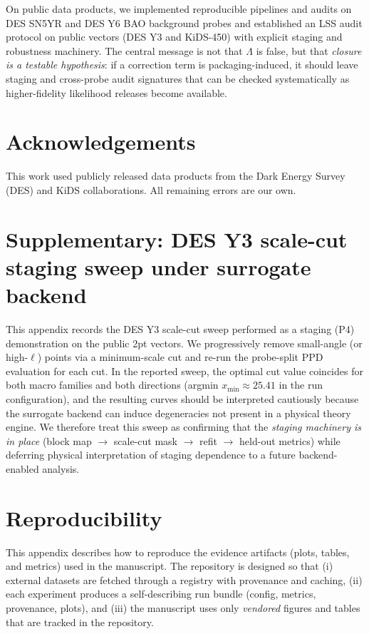 \documentclass[11pt]{article}
\theoremstyle{definition}
\theoremstyle{plain}
\theoremstyle{remark}
\begin{document}
On public data products, we implemented reproducible pipelines and audits on DES SN5YR and DES Y6 BAO background probes and established an LSS audit protocol on public vectors (DES Y3 and KiDS-450) with explicit staging and robustness machinery. The central message is not that $\Lambda$ is false, but that \emph{closure is a testable hypothesis}: if a correction term is packaging-induced, it should leave staging and cross-probe audit signatures that can be checked systematically as higher-fidelity likelihood releases become available.

\section*{Acknowledgements}
This work used publicly released data products from the Dark Energy Survey (DES) and KiDS collaborations. All remaining errors are our own.




\appendix
\section{Supplementary: DES Y3 scale-cut staging sweep under surrogate backend}\label{app:lss_scale_cut}
This appendix records the DES Y3 scale-cut sweep performed as a staging (P4) demonstration on the public 2pt vectors.
We progressively remove small-angle (or high-$\ell$) points via a minimum-scale cut and re-run the probe-split PPD evaluation for each cut.
In the reported sweep, the optimal cut value coincides for both macro families and both directions (argmin $x_{\min}\approx 25.41$ in the run configuration), and the resulting curves should be interpreted cautiously because the surrogate backend can induce degeneracies not present in a physical theory engine.
We therefore treat this sweep as confirming that the \emph{staging machinery is in place} (block map $\to$ scale-cut mask $\to$ refit $\to$ held-out metrics) while deferring physical interpretation of staging dependence to a future backend-enabled analysis.

\section{Reproducibility}\label{app:repro}
This appendix describes how to reproduce the evidence artifacts (plots, tables, and metrics) used in the manuscript. The repository is designed so that (i) external datasets are fetched through a registry with provenance and caching, (ii) each experiment produces a self-describing run bundle (config, metrics, provenance, plots), and (iii) the manuscript uses only \emph{vendored} figures and tables that are tracked in the repository.
\end{document}
